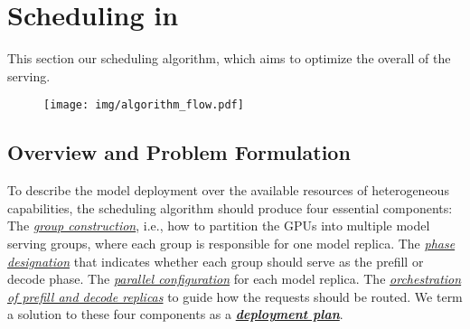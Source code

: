 \section{Scheduling in \sys}
\label{sec:scheduling}
This section  our scheduling algorithm, which aims to optimize the overall  of the serving. 

\begin{figure}[!t] 
  \centering
  \texttt{[image: img/algorithm\_flow.pdf]} %
  \vspace{-1em}
  \caption{}
  \vspace{-1em}
  \label{fig:scheduling_routine}
\end{figure}

\subsection{Overview and Problem Formulation}

To describe the model deployment over the available resources of heterogeneous capabilities, the scheduling algorithm should produce four essential components:  The \ul{\textit{group construction}}, i.e., how to partition the GPUs into multiple model serving groups, where each group is responsible for one model replica. 
 The \ul{\textit{phase designation}} that indicates whether each group should serve as the prefill or decode phase. 
 The \ul{\textit{parallel configuration}} for each model replica.
 The \ul{\textit{orchestration of prefill and decode replicas}} to guide how the requests should be routed. We term a solution to these four components as a \textbf{\ul{\textit{deployment plan}}}.

